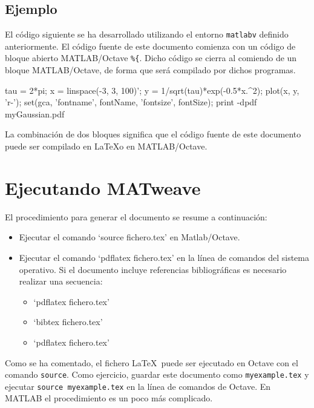\documentclass{article}
\newenvironment{matlabv}{\verbatim}{\endverbatim}
\begin{document}
\subsection{Ejemplo}

El código siguiente se ha desarrollado utilizando el entorno \texttt{matlabv} definido anteriormente. El código fuente de este documento comienza con un código de bloque abierto MATLAB/Octave \texttt{\%\{}. Dicho código se cierra al comiendo de un bloque MATLAB/Octave, de forma que será compilado por dichos programas.

\begin{matlabv}
tau = 2*pi;
x = linspace(-3, 3, 100)';
y = 1/sqrt(tau)*exp(-0.5*x.^2);
plot(x, y, 'r-');
set(gca, 'fontname', fontName, 'fontsize', fontSize);
print -dpdf myGaussian.pdf
\end{matlabv}

La combinación de dos bloques significa que el código fuente de este documento puede ser compilado en \LaTeX o en MATLAB/Octave.

\section{Ejecutando MATweave}

El procedimiento para generar el documento se resume a continuación:

\begin{itemize}
\item Ejecutar el comando `source fichero.tex' en Matlab/Octave.
\item Ejecutar el comando `pdflatex fichero.tex' en la línea de comandos del sistema operativo. Si el documento incluye referencias bibliográficas es necesario realizar una secuencia:
	\begin{itemize}
		\item `pdflatex fichero.tex'
		\item `bibtex fichero.tex'
		\item `pdflatex fichero.tex'
	\end{itemize}
\end{itemize}

Como se ha comentado, el fichero \LaTeX\ puede ser ejecutado en Octave con el comando \texttt{source}. Como ejercicio, guardar este documento como \texttt{myexample.tex} y ejecutar \texttt{source myexample.tex} en la línea de comandos de Octave. En MATLAB el procedimiento es un poco más complicado.
\end{document}
